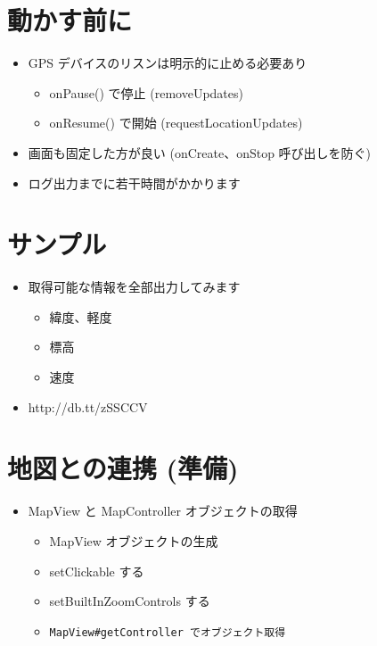 \documentclass[slide,papersize]{jsarticle}
\begin{document}
\section*{動かす前に}
\bigskip
\begin{itemize}
\item {\scriptsize GPS デバイスのリスンは明示的に止める必要あり}
 \begin{itemize}
 \item {\scriptsize onPause() で停止 (removeUpdates)}
 \medskip
 \item {\scriptsize onResume() で開始 (requestLocationUpdates)}
 \end{itemize}
\medskip
\item {\scriptsize 画面も固定した方が良い (onCreate、onStop 呼び出しを防ぐ)}
\medskip
\item {\scriptsize ログ出力までに若干時間がかかります}
\end{itemize}

\section*{サンプル}
\bigskip
\begin{itemize}
\item 取得可能な情報を全部出力してみます
 \begin{itemize}
 \item 緯度、軽度
 \item 標高
 \item 速度
 \end{itemize}
\bigskip
\item http://db.tt/zSSCCV
\end{itemize}

\section*{地図との連携 (準備)}
\bigskip
\begin{itemize}
\item MapView と MapController オブジェクトの取得
 \begin{itemize}
 \item MapView オブジェクトの生成
 \item setClickable する
 \item setBuiltInZoomControls する
 \item \begin{verbatim}MapView#getController でオブジェクト取得\end{verbatim}
 \end{itemize}
\end{itemize}
\end{document}
